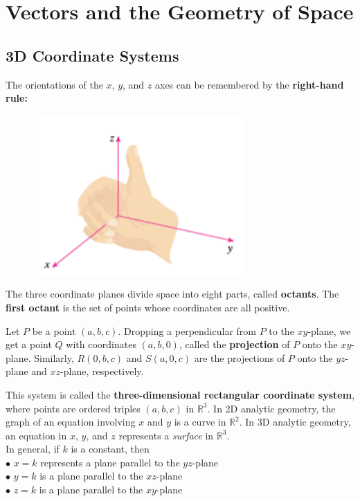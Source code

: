 \section{Vectors and the Geometry of Space}

    \subsection{3D Coordinate Systems}      %

        The orientations of the $x$, $y$, and $z$ axes can be remembered by the \textbf{right-hand rule:} \\
        
        \begin{figure}[hbt!]
            \centering
            \includegraphics[]{Resources/12.1_Right_Hand_Rule}
        \end{figure}

        The three coordinate planes divide space into eight parts, called \textbf{octants}. The \textbf{first octant} is the set of points whose coordinates are all positive.

        Let $P$ be a point $(a,b,c)$. Dropping a perpendicular from $P$ to the $xy$-plane, we get a point $Q$ with coordinates $(a,b,0)$, called the \textbf{projection} of $P$ onto the $xy$-plane. Similarly,
        $R(0,b,c)$ and $S(a,0,c)$ are the projections of $P$ onto the $yz$-plane and $xz$-plane, respectively.

        This system is called the \textbf{three-dimensional rectangular coordinate system}, where points are ordered triples $(a,b,c)$ in $\mathbb{R}^3$. In 2D analytic geometry, the graph of an equation
        involving $x$ and $y$ is a curve in $\mathbb{R}^2$. In 3D analytic geometry, an equation in $x$, $y$, and $z$ represents a \textit{surface} in $\mathbb{R}^3$. \\

        In general, if $k$ is a constant, then \\
        $\bullet$ $x=k$ represents a plane parallel to the $yz$-plane \\
        $\bullet$ $y=k$ is a plane parallel to the $xz$-plane \\
        $\bullet$ $z=k$ is a plane parallel to the $xy$-plane \\

